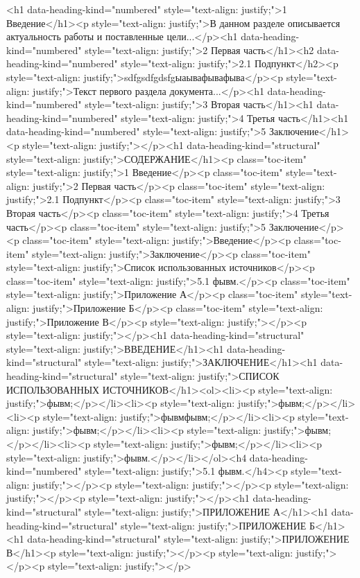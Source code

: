 \documentclass[paper=a4, fontsize=14pt, pagesize, DIV=calc, oneside]{scrreport}
\begin{document}
\pagestyle{empty} 



\newpage
\tableofcontents
\newpage

\pagestyle{plain}
\setcounter{page}{2} 

<h1 data-heading-kind="numbered" style="text-align: justify;">1 Введение</h1><p style="text-align: justify;">В данном разделе описывается актуальность работы и поставленные цели...</p><h1 data-heading-kind="numbered" style="text-align: justify;">2 Первая часть</h1><h2 data-heading-kind="numbered" style="text-align: justify;">2.1 Подпункт</h2><p style="text-align: justify;">sdfgsdfgdsfgыаывафывафыва</p><p style="text-align: justify;">Текст первого раздела документа...</p><h1 data-heading-kind="numbered" style="text-align: justify;">3 Вторая часть</h1><h1 data-heading-kind="numbered" style="text-align: justify;">4 Третья часть</h1><h1 data-heading-kind="numbered" style="text-align: justify;">5 Заключение</h1><p style="text-align: justify;"></p><h1 data-heading-kind="structural" style="text-align: justify;">СОДЕРЖАНИЕ</h1><p class="toc-item" style="text-align: justify;">1 Введение</p><p class="toc-item" style="text-align: justify;">2 Первая часть</p><p class="toc-item" style="text-align: justify;">2.1 Подпункт</p><p class="toc-item" style="text-align: justify;">3 Вторая часть</p><p class="toc-item" style="text-align: justify;">4 Третья часть</p><p class="toc-item" style="text-align: justify;">5 Заключение</p><p class="toc-item" style="text-align: justify;">Введение</p><p class="toc-item" style="text-align: justify;">Заключение</p><p class="toc-item" style="text-align: justify;">Список использованных источников</p><p class="toc-item" style="text-align: justify;">5.1 фывм.</p><p class="toc-item" style="text-align: justify;">Приложение А</p><p class="toc-item" style="text-align: justify;">Приложение Б</p><p class="toc-item" style="text-align: justify;">Приложение В</p><p style="text-align: justify;"></p><p style="text-align: justify;"></p><h1 data-heading-kind="structural" style="text-align: justify;">ВВЕДЕНИЕ</h1><h1 data-heading-kind="structural" style="text-align: justify;">ЗАКЛЮЧЕНИЕ</h1><h1 data-heading-kind="structural" style="text-align: justify;">СПИСОК ИСПОЛЬЗОВАННЫХ ИСТОЧНИКОВ</h1><ol><li><p style="text-align: justify;">фывм;</p></li><li><p style="text-align: justify;">фывм;</p></li><li><p style="text-align: justify;">фывмфывм;</p></li><li><p style="text-align: justify;">фывм;</p></li><li><p style="text-align: justify;">фывм;</p></li><li><p style="text-align: justify;">фывм;</p></li><li><p style="text-align: justify;">фывм.</p></li></ol><h4 data-heading-kind="numbered" style="text-align: justify;">5.1 фывм.</h4><p style="text-align: justify;"></p><p style="text-align: justify;"></p><p style="text-align: justify;"></p><p style="text-align: justify;"></p><h1 data-heading-kind="structural" style="text-align: justify;">ПРИЛОЖЕНИЕ А</h1><h1 data-heading-kind="structural" style="text-align: justify;">ПРИЛОЖЕНИЕ Б</h1><h1 data-heading-kind="structural" style="text-align: justify;">ПРИЛОЖЕНИЕ В</h1><p style="text-align: justify;"></p><p style="text-align: justify;"></p><p style="text-align: justify;"></p>

\newpage
\printbibliography[heading=bibintoc, title={Список использованных источников}]
\end{document}
